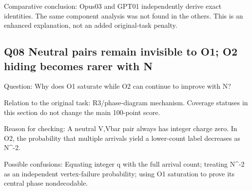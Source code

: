 \documentclass[11pt,a4paper]{article}
\begin{document}
Comparative conclusion: Opus03 and GPT01 independently derive exact identities. The same component analysis was not found in the others. This is an enhanced explanation,\allowbreak{} not an added original-task penalty.

\clearpage
\subsection{Q08 Neutral pairs remain invisible to O1; O2 hiding becomes rarer with N}
\label{aspect:Q08}
Question: Why does O1 saturate while O2 can continue to improve with N?

Relation to the original task: R3/\allowbreak{}phase-diagram mechanism. Coverage statuses in this section do not change the main 100-point score.

Reason for checking: A neutral V,\allowbreak{}Vbar pair always has integer charge zero. In O2,\allowbreak{} the probability that multiple arrivals yield a lower-count label decreases as N\textasciicircum{}-2.

Possible confusions: Equating integer q with the full arrival count; treating N\textasciicircum{}-2 as an independent vertex-failure probability; using O1 saturation to prove its central phase nondecodable.
\end{document}
